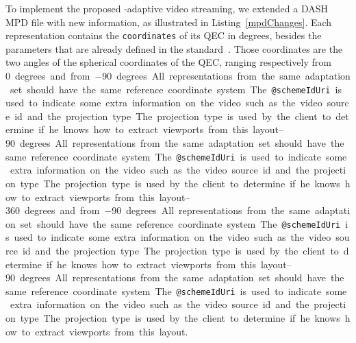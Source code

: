  To implement the proposed
\FoV{}-adaptive video streaming, we extended a \ac{DASH} \ac{MPD}
file with new information, as illustrated in Listing~\ref{mpdChanges}.
Each representation contains the \texttt{coordinates} of its \ac{QEC}
in degrees, besides the parameters that are
already defined in the standard~\cite{iso_iec}.
Those coordinates are the two angles of the spherical coordinates of the \ac{QEC}, ranging respectively from \SIrange{0}{360} degrees and from \SIrange{-90}{90} degrees. All representations from the same adaptation set should have the same reference coordinate system.
The \texttt{@schemeIdUri} is used to indicate some extra information on the video such as the video source id and the projection type. The projection type is used by the client to determine if he knows how to extract viewports from this layout.
